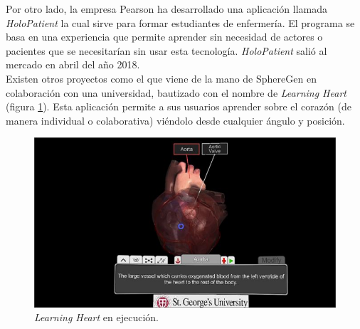 
Por otro lado, la empresa Pearson ha desarrollado una aplicación llamada \textit{HoloPatient} la cual sirve para formar estudiantes de enfermería. El programa se basa en una experiencia que permite aprender sin necesidad de actores o pacientes que se necesitarían sin usar esta tecnología. \textit{HoloPatient} salió al mercado en abril del año 2018.\\

Existen otros proyectos como el que viene de la mano de SphereGen en colaboración con una universidad, bautizado con el nombre de \textit{Learning Heart} (figura \ref{fig:learningheartspheregen}). Esta aplicación permite a sus usuarios aprender sobre el corazón (de manera individual o colaborativa) viéndolo desde cualquier ángulo y posición. \\

\begin{figure}[h]
    \centering
    \includegraphics[scale=0.65]{Images/Estado del arte/learningheartspheregen.jpeg}
    \caption[\textit{Learning Heart} en ejecución.]{\textit{Learning Heart} en ejecución\footnotemark.}
    \label{fig:learningheartspheregen}
\end{figure}




